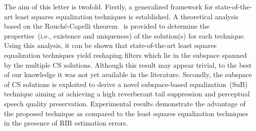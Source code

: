 \documentclass[10pt]{IEEEtran}
\begin{document}
The aim of this letter is twofold.
Firstly, a generalized framework for state-of-the-art least squares equalization techniques is established. 
A theoretical analysis based on the Rouch\'{e}-Capelli theorem~\cite{shafarevic_algebra_book} is provided to determine the properties~(i.e., existence and uniqueness) of the solution(s) for each technique.
Using this analysis, it can be shown that state-of-the-art least squares equalization techniques yield reshaping filters which lie in the subspace spanned by the multiple CS solutions.
Although this result may appear trivial, to the best of our knowledge it was not yet available in the literature.
Secondly, the subspace of CS solutions is exploited to derive a novel subspace-based equalization~(SuB) technique aiming at achieving a high reverberant tail suppression and perceptual speech quality preservation. 
Experimental results demonstrate the advantage of the proposed technique as compared to the least squares equalization techniques in the presence of RIR estimation errors.
\end{document}
